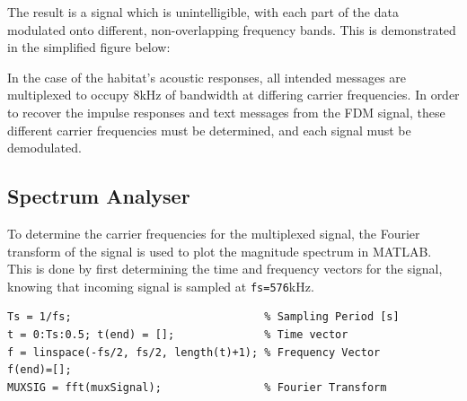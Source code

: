 \documentclass[12pt]{article}
\begin{document}
The result is a signal which is unintelligible, with each part of the data
modulated onto different, non-overlapping frequency bands. This is demonstrated
in the simplified figure below:

\begin{center}
\end{center}

\noindent
In the case of the habitat's acoustic responses, all intended messages are
multiplexed to occupy 8kHz of bandwidth at differing carrier frequencies. In
order to recover the impulse responses and text messages from the FDM signal,
these different carrier frequencies must be determined, and each signal must be
demodulated.
\subsection*{Spectrum Analyser}
To determine the carrier frequencies for the multiplexed signal, the Fourier
transform of the signal is used to plot the magnitude spectrum in MATLAB. This
is done by first determining the time and frequency vectors for the signal,
knowing that incoming signal is sampled at \verb+fs=576+kHz.

\begin{verbatim}
Ts = 1/fs;                              % Sampling Period [s]
t = 0:Ts:0.5; t(end) = [];              % Time vector
f = linspace(-fs/2, fs/2, length(t)+1); % Frequency Vector
f(end)=[];  
MUXSIG = fft(muxSignal);                % Fourier Transform
\end{verbatim}
\end{document}
